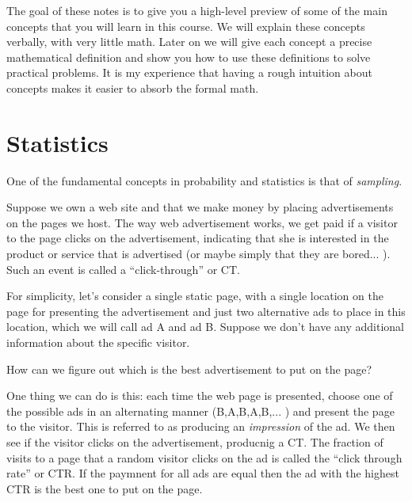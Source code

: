 \documentclass{report}
\theoremstyle{plain}
\theoremstyle{definition}
\begin{document}
\scribe{}

\maketitle

The goal of these notes is to give you a high-level preview of some of
the main concepts that you will learn in this course. We will
explain these concepts verbally, with very little
math. Later on we will give each concept a precise mathematical
definition and show you how to use these definitions to solve
practical problems. It is my experience that having a rough intuition
about concepts makes it easier to absorb the formal math.

\section{Statistics}
One of the fundamental concepts in probability and statistics is that
of {\em sampling}.

Suppose we own a web site and that we make money by placing
advertisements on the pages we host. The way web advertisement works,
we get paid if a visitor to the page clicks on the advertisement,
indicating that she is interested in the product or service that is
advertised (or maybe simply that they are bored... ). Such an event is
called a ``click-through'' or CT.

For simplicity, let's consider a single static page, with a single
location on the page for presenting the advertisement and just two
alternative ads to place in this location, which we will call ad A and
ad B. Suppose we don't have any additional information about the
specific visitor.

How can we figure out which is the best advertisement to put on the
page?

One thing we can do is this: each time the web page is presented,
choose one of the possible ads in an alternating manner
(B,A,B,A,B,... ) and present the page to the visitor. This is referred
to as producing an {\em impression} of the ad.  We then see if the
visitor clicks on the advertisement, producnig a CT. The fraction of visits to a page
that a random visitor clicks on the ad is called the ``click through rate''
or CTR. If the paymnent for all ads are equal then the ad with the
highest CTR is the best one to put on the page.
\end{document}
